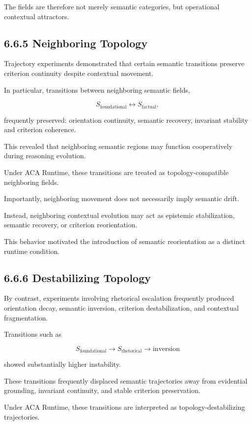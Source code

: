 \documentclass[11pt]{article}
\begin{document}
The fields are therefore not merely semantic categories, but operational contextual attractors.

\subsection{6.6.5 Neighboring Topology}

Trajectory experiments demonstrated that certain semantic transitions preserve criterion continuity despite contextual movement.

In particular, transitions between neighboring semantic fields,

$$
S_{\mathrm{foundational}}
\leftrightarrow
S_{\mathrm{factual}},
$$

frequently preserved: orientation continuity, semantic recovery, invariant stability and criterion coherence.

This revealed that neighboring semantic regions may function cooperatively during reasoning evolution.

Under ACA Runtime, these transitions are treated as topology-compatible neighboring fields.

Importantly, neighboring movement does not necessarily imply semantic drift.

Instead, neighboring contextual evolution may act as epistemic stabilization, semantic recovery, or criterion reorientation.

This behavior motivated the introduction of semantic reorientation as a distinct runtime condition.

\subsection{6.6.6 Destabilizing Topology}

By contrast, experiments involving rhetorical escalation frequently produced orientation decay, semantic inversion, criterion destabilization, and contextual fragmentation.

Transitions such as

$$
S_{\mathrm{foundational}}
\rightarrow
S_{\mathrm{rhetorical}}
\rightarrow
\text{inversion}
$$

showed substantially higher instability.

These transitions frequently displaced semantic trajectories away from evidential grounding, invariant continuity, and stable criterion preservation.

Under ACA Runtime, these transitions are interpreted as topology-destabilizing trajectories.
\end{document}
